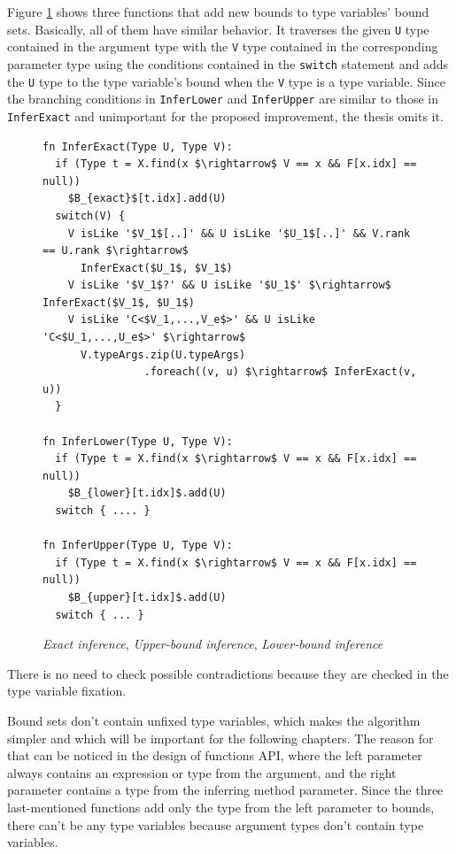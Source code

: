 Figure \ref{img12:methodTypeInference3} shows three functions that add new bounds to type variables’
bound sets. 
Basically, all of them have similar behavior. 
It traverses the given \texttt{U} type contained in the argument type with the \texttt{V} type contained in the corresponding parameter type using the conditions contained in the \texttt{switch} statement and adds the \texttt{U} type to the type variable’s bound when the \texttt{V} type is a type variable. 
Since the branching conditions in \texttt{InferLower} and \texttt{InferUpper} are similar to those in \texttt{InferExact} and unimportant for the proposed improvement, the thesis omits it.
\begin{figure}[h!]
\begin{lstlisting}[style=myAlgo, mathescape=true]
fn InferExact(Type U, Type V):
  if (Type t = X.find(x $\rightarrow$ V == x && F[x.idx] == null)) 
    $B_{exact}$[t.idx].add(U)
  switch(V) {
    V isLike '$V_1$[..]' && U isLike '$U_1$[..]' && V.rank == U.rank $\rightarrow$ 
      InferExact($U_1$, $V_1$)
    V isLike '$V_1$?' && U isLike '$U_1$' $\rightarrow$ InferExact($V_1$, $U_1$)
    V isLike 'C<$V_1,...,V_e$>' && U isLike 'C<$U_1,...,U_e$>' $\rightarrow$
      V.typeArgs.zip(U.typeArgs)
                .foreach((v, u) $\rightarrow$ InferExact(v, u)) 
  }
  
fn InferLower(Type U, Type V):
  if (Type t = X.find(x $\rightarrow$ V == x && F[x.idx] == null)) 
    $B_{lower}[t.idx]$.add(U)
  switch { .... }
  
fn InferUpper(Type U, Type V):
  if (Type t = X.find(x $\rightarrow$ V == x && F[x.idx] == null)) 
    $B_{upper}[t.idx]$.add(U)
  switch { ... }
\end{lstlisting}
\caption{\textit{Exact inference}, \textit{Upper-bound inference}, \textit{Lower-bound inference}}
\label{img12:methodTypeInference3}
\end{figure}
\par
\begin{obs}
There is no need to check possible contradictions because they are checked in the type variable fixation. 
\end{obs}
\begin{obs}
Bound sets don't contain unfixed type variables, which makes the algorithm simpler and which will be important for the following chapters.
The reason for that can be noticed in the design of functions API, where the left parameter always contains an expression or type from the argument, and the right parameter contains a type from the inferring method parameter. 
Since the three last-mentioned functions add only the type from the left parameter to bounds, there can’t be any type variables because argument types don’t contain type variables.
\end{obs}

